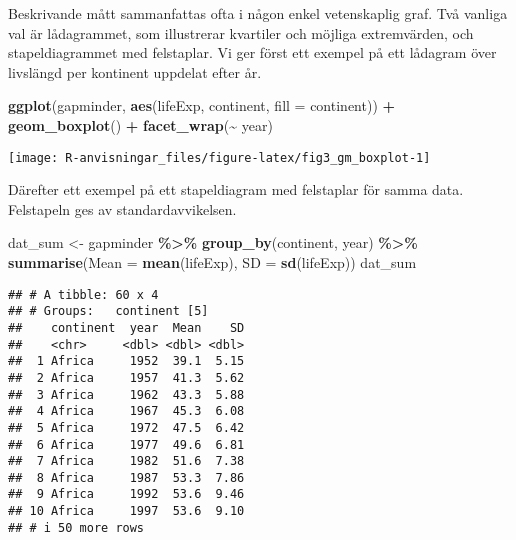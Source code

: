 \documentclass[
]{book}
\newenvironment{Shaded}{\begin{snugshade}}{\end{snugshade}}
\newcommand{\AttributeTok}[1]{\textcolor[rgb]{0.13,0.29,0.53}{#1}}
\newcommand{\FunctionTok}[1]{\textcolor[rgb]{0.13,0.29,0.53}{\textbf{#1}}}
\newcommand{\NormalTok}[1]{#1}
\newcommand{\OtherTok}[1]{\textcolor[rgb]{0.56,0.35,0.01}{#1}}
\newcommand{\SpecialCharTok}[1]{\textcolor[rgb]{0.81,0.36,0.00}{\textbf{#1}}}
\theoremstyle{definition}
\theoremstyle{definition}
\theoremstyle{definition}
\theoremstyle{definition}
\theoremstyle{remark}
\begin{document}
Beskrivande mått sammanfattas ofta i någon enkel vetenskaplig graf. Två vanliga val är lådagrammet, som illustrerar kvartiler och möjliga extremvärden, och stapeldiagrammet med felstaplar. Vi ger först ett exempel på ett lådagram över livslängd per kontinent uppdelat efter år.

\begin{Shaded}
\begin{Highlighting}[]
\FunctionTok{ggplot}\NormalTok{(gapminder, }\FunctionTok{aes}\NormalTok{(lifeExp, continent, }\AttributeTok{fill =}\NormalTok{ continent)) }\SpecialCharTok{+}
  \FunctionTok{geom\_boxplot}\NormalTok{() }\SpecialCharTok{+}
  \FunctionTok{facet\_wrap}\NormalTok{(}\SpecialCharTok{\textasciitilde{}}\NormalTok{ year)}
\end{Highlighting}
\end{Shaded}

\begin{center}\texttt{[image: R-anvisningar\_files/figure-latex/fig3\_gm\_boxplot-1]} \end{center}

Därefter ett exempel på ett stapeldiagram med felstaplar för samma data. Felstapeln ges av standardavvikelsen.

\begin{Shaded}
\begin{Highlighting}[]
\NormalTok{dat\_sum }\OtherTok{\textless{}{-}}\NormalTok{ gapminder }\SpecialCharTok{\%\textgreater{}\%} 
  \FunctionTok{group\_by}\NormalTok{(continent, year) }\SpecialCharTok{\%\textgreater{}\%} 
  \FunctionTok{summarise}\NormalTok{(}\AttributeTok{Mean =} \FunctionTok{mean}\NormalTok{(lifeExp),}
            \AttributeTok{SD =} \FunctionTok{sd}\NormalTok{(lifeExp))}
\NormalTok{dat\_sum}
\end{Highlighting}
\end{Shaded}

\begin{verbatim}
## # A tibble: 60 x 4
## # Groups:   continent [5]
##    continent  year  Mean    SD
##    <chr>     <dbl> <dbl> <dbl>
##  1 Africa     1952  39.1  5.15
##  2 Africa     1957  41.3  5.62
##  3 Africa     1962  43.3  5.88
##  4 Africa     1967  45.3  6.08
##  5 Africa     1972  47.5  6.42
##  6 Africa     1977  49.6  6.81
##  7 Africa     1982  51.6  7.38
##  8 Africa     1987  53.3  7.86
##  9 Africa     1992  53.6  9.46
## 10 Africa     1997  53.6  9.10
## # i 50 more rows
\end{verbatim}
\end{document}

